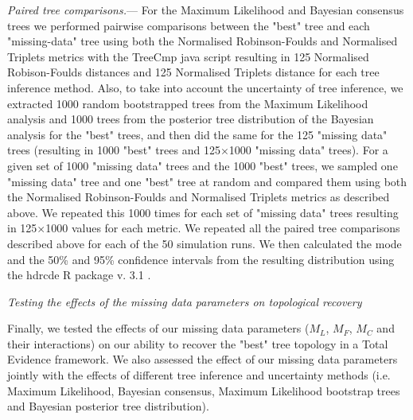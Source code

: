 \documentclass[12pt,letterpaper]{article}
\renewcommand{\subsection}[1]{%
\bigskip
\begin{center}
\begin{large}
\normalfont\itshape #1
\end{large}
\end{center}}
\renewcommand{\subsubsection}[1]{%
\vspace{2ex}
\noindent
\textit{#1.}---}
\begin{document}
\subsubsection{Paired tree comparisons}
\label{tree_comparisons}
For the Maximum Likelihood and Bayesian consensus trees we performed pairwise comparisons between the "best" tree and each "missing-data" tree using both the Normalised Robinson-Foulds and Normalised Triplets metrics with the TreeCmp java script \citep{Bogdanowicz2012} resulting in 125 Normalised Robison-Foulds distances and 125 Normalised Triplets distance for each tree inference method. Also, to take into account the uncertainty of tree inference, we extracted 1000 random bootstrapped trees from the Maximum Likelihood analysis and 1000 trees from the posterior tree distribution of the Bayesian analysis for the "best" trees, and then did the same for the 125 "missing data" trees (resulting in 1000 "best" trees and 125$\times$1000 "missing data" trees). 
For a given set of 1000 "missing data" trees and the 1000 "best" trees, we sampled one "missing data" tree and one "best" tree at random and compared them using both the Normalised Robinson-Foulds and Normalised Triplets metrics as described above. We repeated this 1000 times for each set of "missing data" trees resulting in 125$\times$1000 values for each metric. We repeated all the paired tree comparisons described above for each of the 50 simulation runs. We then calculated the mode and the 50\% and 95\% confidence intervals from the resulting distribution using the hdrcde R package v. 3.1 \citep{hdrcde}.

\subsection{Testing the effects of the missing data parameters on topological recovery}
Finally, we tested the effects of our missing data parameters ($M_{L}$, $M_{F}$, $M_{C}$ and their interactions) on our ability to recover the "best" tree topology in a Total Evidence framework. We also assessed the effect of our missing data parameters jointly with the effects of different tree inference and uncertainty methods (i.e. Maximum Likelihood, Bayesian consensus, Maximum Likelihood bootstrap trees and Bayesian posterior tree distribution).
\end{document}
